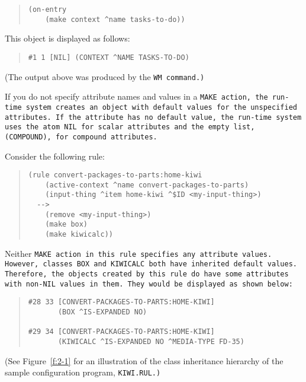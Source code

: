 \begin{quote}
\begin{verbatim}
(on-entry
    (make context ^name tasks-to-do))
\end{verbatim}
\end{quote} 

This object is displayed as follows:

\begin{quote}
\begin{verbatim}
#1 1 [NIL] (CONTEXT ^NAME TASKS-TO-DO)
\end{verbatim}
\end{quote}

(The output above was produced by the \tt{WM} command.)

If you do not specify attribute names and values in a \tt{MAKE}
action, the run-time system creates an object with default values for
the unspecified attributes. If the attribute has no default value, the
run-time system uses the atom \tt{NIL} for scalar attributes and the
empty list, \tt{(COMPOUND)}, for compound attributes.

Consider the following rule:

\begin{quote}
\begin{verbatim}
(rule convert-packages-to-parts:home-kiwi
    (active-context ^name convert-packages-to-parts)
    (input-thing ^item home-kiwi ^$ID <my-input-thing>)
  -->
    (remove <my-input-thing>)
    (make box)
    (make kiwicalc))
\end{verbatim}
\end{quote}

Neither \tt{MAKE} action in this rule specifies any attribute
values. However, classes \tt{BOX} and \tt{KIWICALC} both have
inherited default values.  Therefore, the objects created by this rule
do have some attributes with non-\tt{NIL} values in them. They would
be displayed as shown below:

\begin{quote}
\begin{verbatim}
#28 33 [CONVERT-PACKAGES-TO-PARTS:HOME-KIWI]
       (BOX ^IS-EXPANDED NO)

#29 34 [CONVERT-PACKAGES-TO-PARTS:HOME-KIWI]
       (KIWICALC ^IS-EXPANDED NO ^MEDIA-TYPE FD-35)
\end{verbatim}
\end{quote}

(See Figure~\ref{f:2-1} for an illustration of the class inheritance
hierarchy of the sample configuration program, \tt{KIWI.RUL}.)

